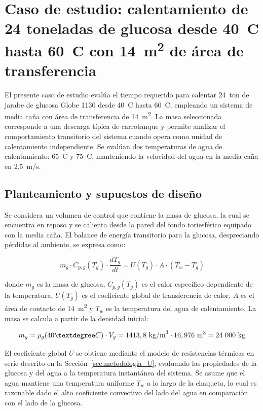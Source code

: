 \section{Caso de estudio: calentamiento de 24 toneladas de glucosa desde 40~\textdegree C hasta 60~\textdegree C con 14~m\textsuperscript{2} de área de transferencia}
\label{sec:calentamiento_24ton}

El presente caso de estudio evalúa el tiempo requerido para calentar 24~ton de jarabe de glucosa Globe 1130 desde 40~\textdegree C hasta 60~\textdegree C, empleando un sistema de media caña con área de transferencia de 14~m\textsuperscript{2}. La masa seleccionada corresponde a una descarga típica de carrotanque y permite analizar el comportamiento transitorio del sistema cuando opera como unidad de calentamiento independiente. Se evalúan dos temperaturas de agua de calentamiento: 65~\textdegree C y 75~\textdegree C, manteniendo la velocidad del agua en la media caña en 2,5~m/s.

\subsection{Planteamiento y supuestos de diseño}

Se considera un volumen de control que contiene la masa de glucosa, la cual se encuentra en reposo y se calienta desde la pared del fondo toriesférico equipado con la media caña. El balance de energía transitorio para la glucosa, despreciando pérdidas al ambiente, se expresa como:

\begin{equation}
m_g \cdot C_{p,g}(T_g) \cdot \frac{dT_g}{dt} = U(T_g) \cdot A \cdot (T_w - T_g)
\label{eq:balance_24ton}
\end{equation}

donde $m_g$ es la masa de glucosa, $C_{p,g}(T_g)$ es el calor específico dependiente de la temperatura, $U(T_g)$ es el coeficiente global de transferencia de calor, $A$ es el área de contacto de 14~m\textsuperscript{2} y $T_w$ es la temperatura del agua de calentamiento. La masa se calcula a partir de la densidad inicial:

\begin{equation}
m_g = \rho_g(40\textdegree C) \cdot V_g = 1413,8~\text{kg/m}^3 \cdot 16,976~\text{m}^3 = 24~000~\text{kg}
\label{eq:masa_24ton}
\end{equation}

El coeficiente global $U$ se obtiene mediante el modelo de resistencias térmicas en serie descrito en la Sección~\ref{sec:metodologia_U}, evaluando las propiedades de la glucosa y del agua a la temperatura instantánea del sistema. Se asume que el agua mantiene una temperatura uniforme $T_w$ a lo largo de la chaqueta, lo cual es razonable dado el alto coeficiente convectivo del lado del agua en comparación con el lado de la glucosa.


